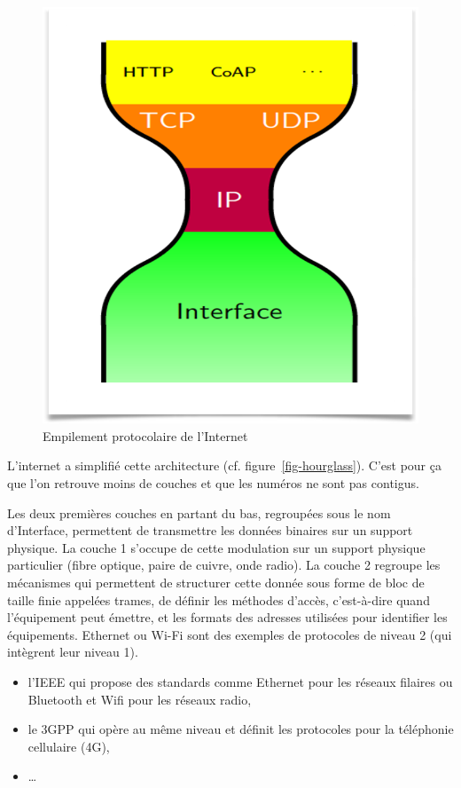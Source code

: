  \begin{figure}[tbp]
\centerline{\includegraphics[width=.5\columnwidth]{Pictures/hourglass.png}}
\caption{Empilement protocolaire de l'Internet}
\label{fig-hourglass}
\end{figure}

  \vspace{1em}

\begin{figure}
\end{figure}

  L'internet a simplifié cette architecture (cf. figure~\vref{fig-hourglass}). C'est pour ça que l'on retrouve moins de couches et que les numéros ne sont pas contigus. 
  
  
    \vspace{1em}

  Les deux premières couches  en partant du bas, regroupées sous le nom d'Interface, permettent de transmettre les données binaires sur un support physique. La couche 1 s’occupe de cette modulation sur un support physique particulier (fibre optique, paire de cuivre, onde radio). La couche 2 regroupe les mécanismes qui permettent de structurer cette donnée sous forme de bloc de taille finie appelées trames, de définir les méthodes d’accès, c’est-à-dire quand l’équipement peut émettre, et les formats des adresses utilisées pour identifier les équipements. Ethernet ou Wi-Fi sont des exemples de protocoles de niveau 2 (qui intègrent leur niveau 1).

\begin{itemize}
\item l’\ac{IEEE} qui propose des standards comme Ethernet pour les réseaux filaires ou Bluetooth et Wifi pour les réseaux radio,
\item le \ac{3GPP}  qui opère au même niveau et définit les protocoles pour la téléphonie cellulaire (4G),
\item \ldots
\end{itemize}

